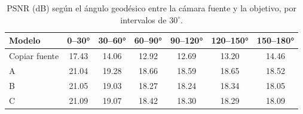 \begin{table}[t]
\centering
\caption{PSNR ({\upshape dB}) según el ángulo geodésico entre la cámara fuente y la objetivo, por intervalos de $30^\circ$.}
\label{tab:angulos}
\setlength{\tabcolsep}{2.5pt}
\begin{tabular}{lcccccc}
\toprule
Modelo & 0–30° & 30–60° & 60–90° & 90–120° & 120–150° & 150–180° \\
\midrule
Copiar fuente & 17.43 & 14.06 & 12.92 & 12.69 & 13.20 & 14.46 \\
A & 21.04 & 19.28 & 18.66 & 18.59 & 18.65 & 18.52 \\
B & 21.05 & 19.03 & 18.27 & 18.24 & 18.34 & 18.05 \\
C & 21.09 & 19.07 & 18.42 & 18.30 & 18.29 & 18.09 \\
\bottomrule
\end{tabular}
\end{table}
